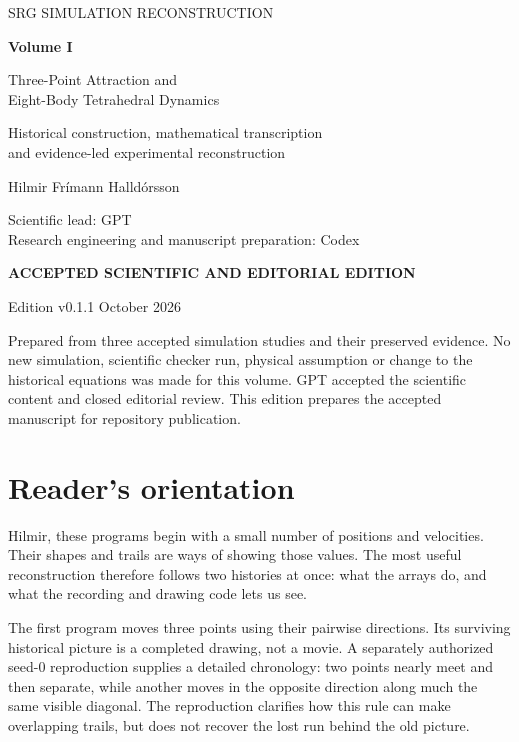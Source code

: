 \documentclass[11pt,a4paper,oneside]{report}
\begin{document}
\hypersetup{pageanchor=false}
\begin{titlepage}
\color{ink}
\vspace*{18mm}
{\sffamily\large SRG SIMULATION RECONSTRUCTION\par}
\vspace{9mm}
{\Huge\bfseries Volume I\par}
\vspace{6mm}
{\LARGE Three-Point Attraction and\\[2mm] Eight-Body Tetrahedral Dynamics\par}
\vspace{13mm}
{\large Historical construction, mathematical transcription\\and evidence-led experimental reconstruction\par}
\vspace{18mm}
{\large Hilmir Frímann Halldórsson\par}
\vspace{3mm}
Scientific lead: GPT\\
Research engineering and manuscript preparation: Codex
\vfill
{\sffamily\bfseries ACCEPTED SCIENTIFIC AND EDITORIAL EDITION\par}
\vspace{3mm}
Edition v0.1.1  October 2026\par
\vspace{6mm}
\begin{minipage}{0.9\linewidth}\small
Prepared from three accepted simulation studies and their preserved evidence.
No new simulation, scientific checker run, physical assumption or change to the
historical equations was made for this volume. GPT accepted the scientific content
and closed editorial review. This edition prepares the accepted manuscript
for repository publication.
\end{minipage}
\end{titlepage}
\hypersetup{pageanchor=true}
\chapter*{Reader's orientation}
Hilmir, these programs begin with a small number of positions and velocities.
Their shapes and trails are ways of showing those values. The most useful
reconstruction therefore follows two histories at once: what the arrays do,
and what the recording and drawing code lets us see.

The first program moves three points using their pairwise directions. Its
surviving historical picture is a completed drawing, not a movie. A separately
authorized seed-0 reproduction supplies a detailed chronology: two points
nearly meet and then separate, while another moves in the opposite direction
along much the same visible diagonal. The reproduction clarifies how this rule
can make overlapping trails, but does not recover the lost run behind the old
picture.
\end{document}
